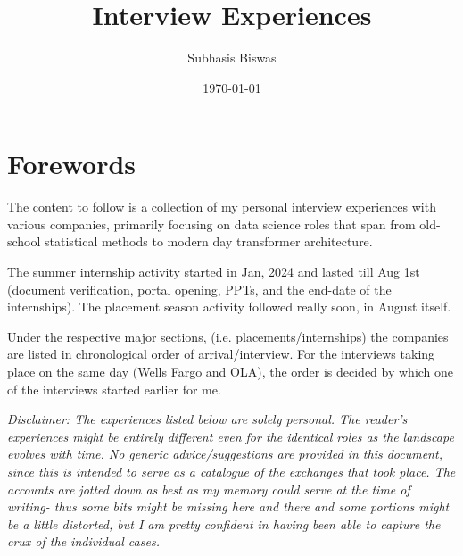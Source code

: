 \documentclass[12pt]{article}
\title{Interview Experiences}
\author{Subhasis Biswas}
\date{\today} %
\begin{document}
\maketitle
\tableofcontents

\section*{Forewords}

The content to follow is a collection of my personal interview experiences with various companies, primarily focusing on data science roles that span from old-school statistical methods to modern day transformer architecture.

The summer internship activity started in Jan, 2024 and lasted till Aug 1st (document verification, portal opening, PPTs, and the end-date of the internships). The placement season activity followed really soon, in August itself.

Under the respective major sections, (i.e. placements/internships) the companies are listed in chronological order of arrival/interview. For the interviews taking place on the same day (Wells Fargo and OLA), the order is decided by which one of the interviews started earlier for me. 

\textit{Disclaimer: The experiences listed below are solely personal. The reader's experiences might be entirely different even for the identical roles as the landscape evolves with time. No generic advice/suggestions are provided in this document, since this is intended to serve as a catalogue of the exchanges that took place. The accounts are jotted down as best as my memory could serve at the time of writing- thus some bits might be missing here and there and some portions might be a little distorted, but I am pretty confident in having been able to capture the crux of the individual cases.}
\end{document}
